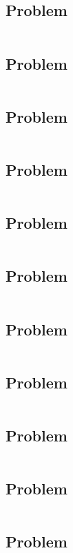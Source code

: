 
\subsection{Problem}
\inputminted[breaklines, linenos]{bash}{6-10-2020/01.sh}
\subsection{Problem}
\inputminted[breaklines, linenos]{bash}{6-10-2020/02.sh}
\subsection{Problem}
\inputminted[breaklines, linenos]{bash}{6-10-2020/03.sh}
\subsection{Problem}
\inputminted[breaklines, linenos]{bash}{6-10-2020/04.sh}
\subsection{Problem}
\inputminted[breaklines, linenos]{bash}{6-10-2020/05.sh}
\subsection{Problem}
\inputminted[breaklines, linenos]{bash}{6-10-2020/06.sh}
\subsection{Problem}
\inputminted[breaklines, linenos]{bash}{6-10-2020/07.sh}
\subsection{Problem}
\inputminted[breaklines, linenos]{bash}{6-10-2020/08.sh}
\subsection{Problem}
\inputminted[breaklines, linenos]{bash}{6-10-2020/09.sh}
\subsection{Problem}
\inputminted[breaklines, linenos]{bash}{6-10-2020/10.sh}
\subsection{Problem}
\inputminted[breaklines, linenos]{bash}{6-10-2020/11.sh}
